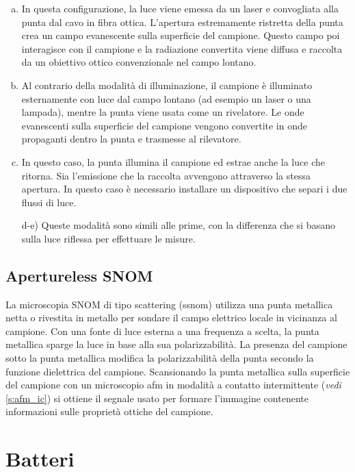 \documentclass[../main.tex]{subfiles}
\begin{document}
\begin{enumerate}[a)]
	\item In questa configurazione, la luce viene emessa da un laser e convogliata alla punta dal cavo in fibra ottica. L'apertura estremamente ristretta della punta crea un campo evanescente sulla superficie del campione. Questo campo poi interagisce con il campione e la radiazione convertita viene diffusa e raccolta da un obiettivo ottico convenzionale nel campo lontano.
	\item Al contrario della modalità di illuminazione, il campione è illuminato esternamente con luce dal campo lontano (ad esempio un laser o una lampada), mentre la punta viene usata come un rivelatore. Le onde evanescenti sulla superficie del campione vengono convertite in onde propaganti dentro la punta e trasmesse al rilevatore.
	\item In questo caso, la punta illumina il campione ed estrae anche la luce che ritorna. Sia l'emissione che la raccolta avvengono attraverso la stessa apertura. In questo caso è necessario installare un dispositivo che separi i due flussi di luce.
	\item[d-e)] Queste modalità sono simili alle prime, con la differenza che si basano sulla luce riflessa per effettuare le misure.
\end{enumerate}

\subsection{Apertureless SNOM}

La microscopia SNOM di tipo scattering (\acrshort{ssnom}) utilizza una punta metallica netta o rivestita in metallo per sondare il campo elettrico locale in vicinanza al campione. Con una fonte di luce esterna a una frequenza a scelta, la punta metallica sparge la luce in base alla sua polarizzabilità. La presenza del campione sotto la punta metallica modifica la polarizzabilità della punta secondo la funzione dielettrica del campione. Scansionando la punta metallica sulla superficie del campione con un microscopio \acrshort{afm} in modalità a contatto intermittente (\textit{vedi} \ref{s:afm_ic}) si ottiene il segnale usato per formare l'immagine contenente informazioni sulle proprietà ottiche del campione.\cite{wang_2015}


\section{Batteri}
\end{document}
